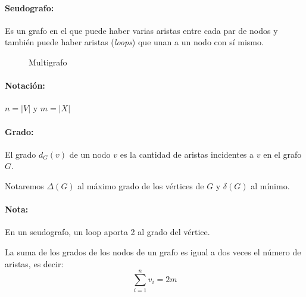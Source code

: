 \paragraph{Seudografo:} Es un grafo en el que puede haber varias aristas entre cada par de nodos y también puede haber aristas (\textit{loops}) que unan a un nodo con sí mismo.
	
\begin{figure}[H]
	\begin{center}
	\end{center}		
	\caption{Multigrafo}
\end{figure}

\paragraph{Notación:} \(n = |V|\) y \(m=|X|\)

\paragraph{Grado:} El grado \(d_G(v)\) de un nodo \(v\) es la cantidad de aristas incidentes a \(v\) en el grafo \(G\). 

Notaremos \(\Delta(G)\) al máximo grado de los vértices de \(G\) y \(\delta(G)\) al mínimo.

\paragraph{Nota:} En un seudografo, un loop aporta 2 al grado del vértice.

\begin{theorem}
La suma de los grados de los nodos de un grafo es igual a dos veces el número de aristas, es decir: \[\sum_{i=1}^{n}v_i = 2m\]
\end{theorem}

